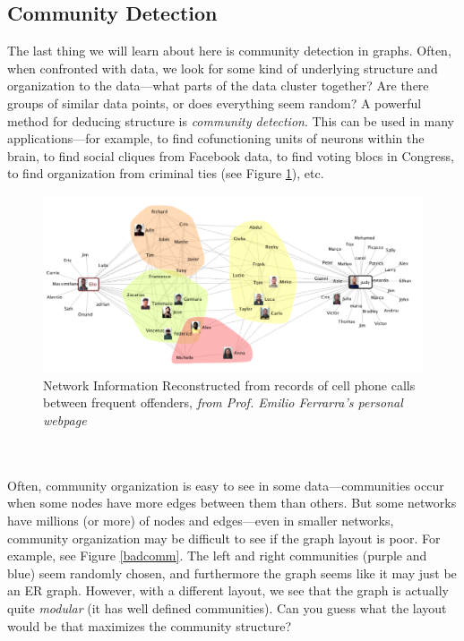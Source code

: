 \documentclass[12pt]{article}
\begin{document}
\subsection{Community Detection}
The last thing we will learn about here is community detection in graphs. Often, when confronted with data, we look for some kind of underlying structure and organization to the data---what parts of the data cluster together? Are there groups of similar data points, or does everything seem random? A powerful method for deducing structure is \emph{community detection}. This can be used in many applications---for example, to find cofunctioning units of neurons within the brain, to find social cliques from Facebook data, to find voting blocs in Congress, to find organization from criminal ties (see Figure \ref{crime}), etc.
\begin{figure}[htbp]
\begin{center}
\includegraphics[width=.8\linewidth]{crime}
\caption{Network Information Reconstructed from records of cell phone calls between frequent offenders, \emph{from Prof. Emilio Ferrarra's personal webpage}}
\label{crime}
\end{center}
\end{figure}
\\
\\Often, community organization is easy to see in some data---communities occur when some nodes have more edges between them than others. But some networks have millions (or more) of nodes and edges---even in smaller networks, community organization may be difficult to see if the graph layout is poor. For example, see Figure \ref{badcomm}. The left and right communities (purple and blue) seem randomly chosen, and furthermore the graph seems like it may just be an ER graph. However, with a different layout, we see that the graph is actually quite \emph{modular} (it has well defined communities). Can you guess what the layout would be that maximizes the community structure? \\
\end{document}
